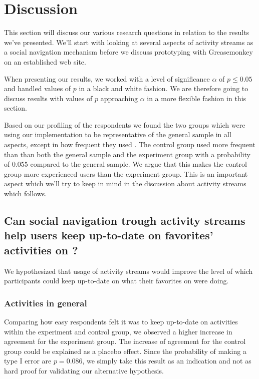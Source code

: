 \section{Discussion}

This section will discuss our various research questions in relation
to the results we've presented. We'll start with looking at
several aspects of activity streams as a social navigation
mechanism before we discuss prototyping with Greasemonkey on
an established web site.

When presenting our results, we worked with a level of significance
$\alpha$ of $p \leq 0.05$%
and handled values of $p$ in a black and white fashion.
We are therefore going to discuss results with values of $p$ approaching
$\alpha$ in a more flexible fashion in this section.

Based on our profiling of the respondents%
we found the two groups which were using our implementation to be
representative of the general sample in all aspects, except in how
frequent they used \urort{}. The control group used \urort{} more
frequent than than both the general sample and the experiment group
with a probability of 0.055 compared to the general sample.
We argue that this makes the control group more experienced
\urort{} users than the experiment group.
This is an important aspect which we'll try to keep in mind in
the discussion about activity streams which follows.

\subsection{%
  Can social navigation trough activity streams help users keep
  up-to-date on favorites' activities on \urort{}?
}

We hypothesized that usage of activity streams would improve the level
of which participants could keep up-to-date on what their favorites
on \urort{} were doing.

\subsubsection{Activities in general}

Comparing how easy respondents felt it was to keep up-to-date on activities
within the experiment and control group,%
we observed a higher increase in agreement for the experiment group. The
increase of agreement for the control group could be explained as
a placebo effect.
Since the probability of making a type I error are
$p = 0.086$, we simply take this result as an indication and not as hard proof
for validating our alternative hypothesis.

